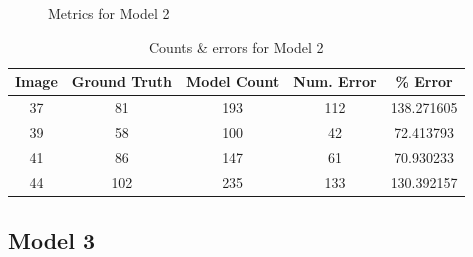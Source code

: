 \begin{appendices}
\begin{figure}[h!]
\caption{Metrics for Model 2}
\end{figure}

\begin{table}[h!]
\centering
\begin{tabular}{||c c c c c||} 
\hline
Image &  Ground Truth &  Model Count &  Num. Error &    \% Error \\
\hline\hline
37 &            81 &          193 &         112 &  138.271605 \\
39 &            58 &          100 &          42 &   72.413793 \\
41 &            86 &          147 &          61 &   70.930233 \\
44 &           102 &          235 &         133 &  130.392157 \\
\hline
\end{tabular}
\caption{Counts \& errors for Model 2}
\label{count_2}
\end{table}

\subsection{Model 3}


\end{appendices}

